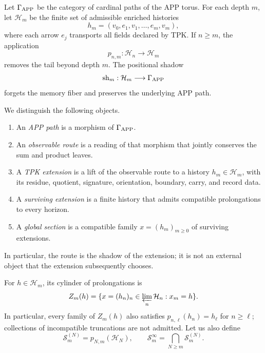 Let \(\Gamma_{\rm APP}\) be the category of cardinal paths of the APP torus\@.
For each depth \(m\), let \(\mathcal H_m\) be the finite set of
admissible enriched histories
\[
 h_m=(v_0,e_1,v_1,\ldots,e_m,v_m),
\]
where each arrow \(e_j\) transports all fields declared by TPK\@. If
\(n\geq m\), the application
\[
 p_{n,m}:\mathcal H_n\longrightarrow\mathcal H_m
\]
removes the tail beyond depth \(m\). The positional shadow
\[
 \operatorname{sh}_m:\mathcal H_m\longrightarrow\Gamma_{\rm APP}
\]
forgets the memory fiber and preserves the underlying APP path.

\begin{definition}
\label{def:jerarquia-extensiones}
We distinguish the following objects.
\begin{enumerate}
  \item An \emph{APP path} is a morphism of
  \(\Gamma_{\rm APP}\).
  \item An \emph{observable route} is a reading of that morphism that
  jointly conserves the sum and product leaves.
  \item A \emph{TPK extension} is a lift of the observable route to
  a history \(h_m\in\mathcal H_m\), with its residue, quotient,
  signature, orientation, boundary, carry, and record data.
  \item A \emph{surviving extension} is a finite history that admits
  compatible prolongations to every horizon.
  \item A \emph{global section} is a compatible family
  \(x=(h_m)_{m\geq0}\) of surviving extensions.
\end{enumerate}
In particular, the route is the shadow of the extension; it is not an external object
that the extension subsequently chooses.
\end{definition}

For \(h\in\mathcal H_m\), its cylinder of prolongations is
\[
 Z_m(h)=
 \{x=(h_n)_n\in\varprojlim_n\mathcal H_n:x_m=h\}.
\]
In particular, every family of \(Z_m(h)\) also satisfies
\(p_{n,\ell}(h_n)=h_\ell\) for \(n\geq\ell\); collections of
incompatible truncations are not admitted.
Let us also define
\[
 \mathcal S_m^{(N)}=p_{N,m}(\mathcal H_N),
 \qquad
 \mathcal S_m^\infty=\bigcap_{N\geq m}\mathcal S_m^{(N)}.
\]

